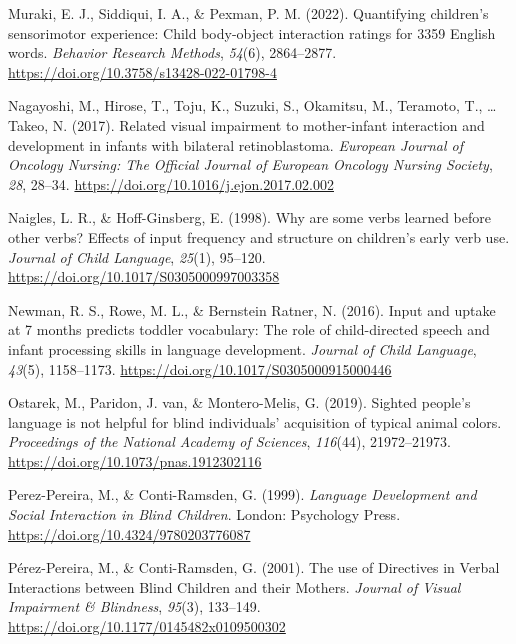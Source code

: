 \documentclass[
  man,floatsintext]{apa6}
\newlength{\cslhangindent}
\newlength{\cslentryspacingunit} %
\newenvironment{CSLReferences}[2] %
 {%
  \setlength{\parindent}{0pt}
  \ifodd #1
  \let\oldpar\par
  \def\par{\hangindent=\cslhangindent\oldpar}
  \fi
  \setlength{\parskip}{#2\cslentryspacingunit}
 }%
 {}
\begin{document}
\begin{CSLReferences}{1}{0}
\leavevmode{}%
Muraki, E. J., Siddiqui, I. A., \& Pexman, P. M. (2022). Quantifying children's sensorimotor experience: {Child} body-object interaction ratings for 3359 {English} words. \emph{Behavior Research Methods}, \emph{54}(6), 2864--2877. \url{https://doi.org/10.3758/s13428-022-01798-4}

\leavevmode{}%
Nagayoshi, M., Hirose, T., Toju, K., Suzuki, S., Okamitsu, M., Teramoto, T., \ldots{} Takeo, N. (2017). Related visual impairment to mother-infant interaction and development in infants with bilateral retinoblastoma. \emph{European Journal of Oncology Nursing: The Official Journal of European Oncology Nursing Society}, \emph{28}, 28--34. \url{https://doi.org/10.1016/j.ejon.2017.02.002}

\leavevmode{}%
Naigles, L. R., \& Hoff-Ginsberg, E. (1998). Why are some verbs learned before other verbs? {Effects} of input frequency and structure on children's early verb use. \emph{Journal of Child Language}, \emph{25}(1), 95--120. \url{https://doi.org/10.1017/S0305000997003358}

\leavevmode{}%
Newman, R. S., Rowe, M. L., \& Bernstein Ratner, N. (2016). Input and uptake at 7 months predicts toddler vocabulary: The role of child-directed speech and infant processing skills in language development. \emph{Journal of Child Language}, \emph{43}(5), 1158--1173. \url{https://doi.org/10.1017/S0305000915000446}

\leavevmode{}%
Ostarek, M., Paridon, J. van, \& Montero-Melis, G. (2019). Sighted people's language is not helpful for blind individuals' acquisition of typical animal colors. \emph{Proceedings of the National Academy of Sciences}, \emph{116}(44), 21972--21973. \url{https://doi.org/10.1073/pnas.1912302116}

\leavevmode{}%
Perez-Pereira, M., \& Conti-Ramsden, G. (1999). \emph{Language {Development} and {Social Interaction} in {Blind Children}}. {London}: {Psychology Press}. \url{https://doi.org/10.4324/9780203776087}

\leavevmode{}%
Pérez-Pereira, M., \& Conti-Ramsden, G. (2001). The use of {Directives} in {Verbal Interactions} between {Blind Children} and their {Mothers}. \emph{Journal of Visual Impairment \& Blindness}, \emph{95}(3), 133--149. \url{https://doi.org/10.1177/0145482x0109500302}


\end{CSLReferences}
\end{document}
